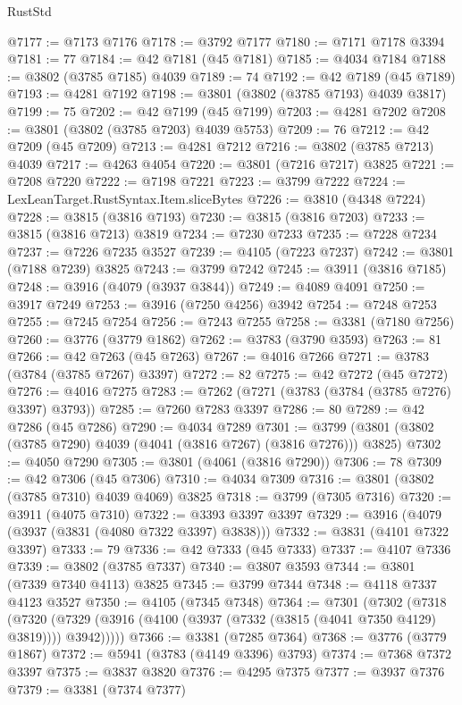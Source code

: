 \begin{lexlean}{RustStd}
\begin{coremodule}
@7177 := @7173 @7176
@7178 := @3792 @7177
@7180 := @7171 @7178 @3394
@7181 := 77
@7184 := @42 @7181 (@45 @7181)
@7185 := @4034 @7184
@7188 := @3802 (@3785 @7185) @4039
@7189 := 74
@7192 := @42 @7189 (@45 @7189)
@7193 := @4281 @7192
@7198 := @3801 (@3802 (@3785 @7193) @4039 @3817)
@7199 := 75
@7202 := @42 @7199 (@45 @7199)
@7203 := @4281 @7202
@7208 := @3801 (@3802 (@3785 @7203) @4039 @5753)
@7209 := 76
@7212 := @42 @7209 (@45 @7209)
@7213 := @4281 @7212
@7216 := @3802 (@3785 @7213) @4039
@7217 := @4263 @4054
@7220 := @3801 (@7216 @7217) @3825
@7221 := @7208 @7220
@7222 := @7198 @7221
@7223 := @3799 @7222
@7224 := LexLeanTarget.RustSyntax.Item.sliceBytes
@7226 := @3810 (@4348 @7224)
@7228 := @3815 (@3816 @7193)
@7230 := @3815 (@3816 @7203)
@7233 := @3815 (@3816 @7213) @3819
@7234 := @7230 @7233
@7235 := @7228 @7234
@7237 := @7226 @7235 @3527
@7239 := @4105 (@7223 @7237)
@7242 := @3801 (@7188 @7239) @3825
@7243 := @3799 @7242
@7245 := @3911 (@3816 @7185)
@7248 := @3916 (@4079 (@3937 @3844))
@7249 := @4089 @4091
@7250 := @3917 @7249
@7253 := @3916 (@7250 @4256) @3942
@7254 := @7248 @7253
@7255 := @7245 @7254
@7256 := @7243 @7255
@7258 := @3381 (@7180 @7256)
@7260 := @3776 (@3779 @1862)
@7262 := @3783 (@3790 @3593)
@7263 := 81
@7266 := @42 @7263 (@45 @7263)
@7267 := @4016 @7266
@7271 := @3783 (@3784 (@3785 @7267) @3397)
@7272 := 82
@7275 := @42 @7272 (@45 @7272)
@7276 := @4016 @7275
@7283 := @7262 (@7271 (@3783 (@3784 (@3785 @7276) @3397) @3793))
@7285 := @7260 @7283 @3397
@7286 := 80
@7289 := @42 @7286 (@45 @7286)
@7290 := @4034 @7289
@7301 := @3799 (@3801 (@3802 (@3785 @7290) @4039 (@4041 (@3816 @7267) (@3816 @7276))) @3825)
@7302 := @4050 @7290
@7305 := @3801 (@4061 (@3816 @7290))
@7306 := 78
@7309 := @42 @7306 (@45 @7306)
@7310 := @4034 @7309
@7316 := @3801 (@3802 (@3785 @7310) @4039 @4069) @3825
@7318 := @3799 (@7305 @7316)
@7320 := @3911 (@4075 @7310)
@7322 := @3393 @3397 @3397
@7329 := @3916 (@4079 (@3937 (@3831 (@4080 @7322 @3397) @3838)))
@7332 := @3831 (@4101 @7322 @3397)
@7333 := 79
@7336 := @42 @7333 (@45 @7333)
@7337 := @4107 @7336
@7339 := @3802 (@3785 @7337)
@7340 := @3807 @3593
@7344 := @3801 (@7339 @7340 @4113) @3825
@7345 := @3799 @7344
@7348 := @4118 @7337 @4123 @3527
@7350 := @4105 (@7345 @7348)
@7364 := @7301
    (@7302
      (@7318
        (@7320 (@7329 (@3916 (@4100 (@3937 (@7332 (@3815 (@4041 @7350 @4129) @3819)))) @3942)))))
@7366 := @3381 (@7285 @7364)
@7368 := @3776 (@3779 @1867)
@7372 := @5941 (@3783 (@4149 @3396) @3793)
@7374 := @7368 @7372 @3397
@7375 := @3837 @3820
@7376 := @4295 @7375
@7377 := @3937 @7376
@7379 := @3381 (@7374 @7377)

\end{coremodule}
\end{lexlean}
